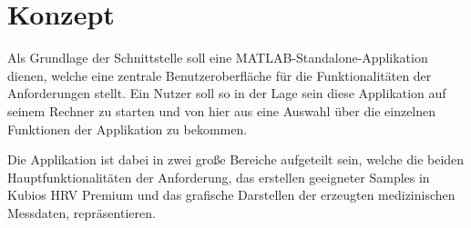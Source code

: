 
\chapter{Konzept}

Als Grundlage der Schnittstelle soll eine MATLAB-Standalone-Applikation dienen, welche eine zentrale Benutzeroberfläche für die Funktionalitäten der Anforderungen stellt. Ein Nutzer soll so in der Lage sein diese Applikation auf seinem Rechner zu starten und von hier aus eine Auswahl über die einzelnen Funktionen der Applikation zu bekommen.

Die Applikation ist dabei in zwei große Bereiche aufgeteilt sein, welche die beiden Hauptfunktionalitäten der Anforderung, das erstellen geeigneter Samples in Kubios HRV Premium und das grafische Darstellen der erzeugten medizinischen Messdaten, repräsentieren.
